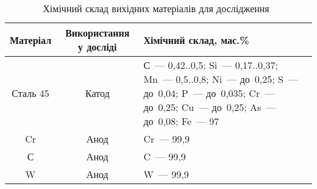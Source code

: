 \begin{table}[h!]
\centering
\caption{Хімічний склад вихідних матеріалів для дослідження~\cite{steel45}}
\label{tab:precursor}
\begin{tabular}{|c|c|p{7.9cm}|}
\hline
Матеріал  & Використання у досліді & Хімічний склад, мас.\%\\\hline
Сталь 45&Катод&С~--- 0,42..0,5; Si~--- 0,17..0,37; Mn~--- 0,5..0,8; Ni~--- до~0,25; S~--- до~0,04; P~--- до~0,035; Cr~--- до~0,25; Cu~--- до~0,25; As~--- до~0,08; Fe~--- 97\\\hline
Cr&Анод&Cr~--- 99,9\\\hline
С&Анод&C~--- 99,9\\\hline
W&Анод&W~--- 99,9\\\hline
\end{tabular}
\end{table}
